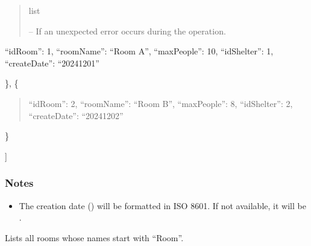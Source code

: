 \documentclass[letterpaper,10pt,english]{sphinxmanual}
\begin{document}
\begin{fulllineitems}
\begin{fulllineitems}
\begin{quote}
\begin{description}
\begin{description}
\end{description}


\sphinxAtStartPar
list

\sphinxAtStartPar
{} – If an unexpected error occurs during the operation.

\end{description}\end{quote}
\begin{description}
\begin{description}
\sphinxlineitem{{[}}\begin{description}
\sphinxlineitem{\{}
\sphinxAtStartPar
“idRoom”: 1,
“roomName”: “Room A”,
“maxPeople”: 10,
“idShelter”: 1,
“createDate”: “2024\sphinxhyphen{}12\sphinxhyphen{}01”

\end{description}

\sphinxAtStartPar
\},
\{
\begin{quote}

\sphinxAtStartPar
“idRoom”: 2,
“roomName”: “Room B”,
“maxPeople”: 8,
“idShelter”: 2,
“createDate”: “2024\sphinxhyphen{}12\sphinxhyphen{}02”
\end{quote}

\sphinxAtStartPar
\}

\end{description}

\sphinxAtStartPar
{]}

\end{description}
\subsubsection*{Notes}
\begin{itemize}
\item {} 
\sphinxAtStartPar
The creation date () will be formatted in ISO 8601. If not available, it will be .

\end{itemize}

\end{fulllineitems}


\begin{fulllineitems}
\label{\detokenize{app.controllers:app.controllers.room_controller.RoomController.list_rooms_Room}}
\pysigstartsignatures
\pysiglinewithargsret
{}
{}
{}
\pysigstopsignatures
\sphinxAtStartPar
Lists all rooms whose names start with “Room”.


\end{fulllineitems}
\end{fulllineitems}
\end{document}
